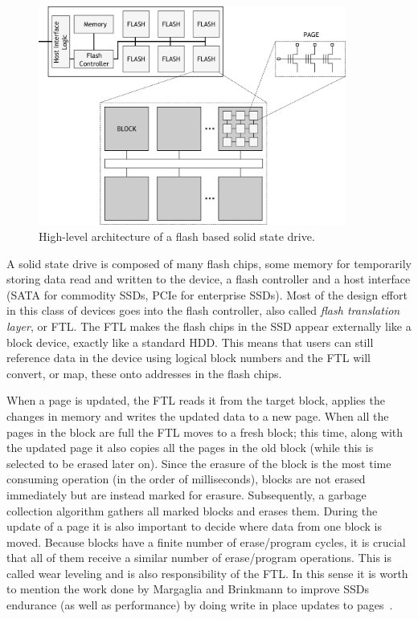 \begin{figure}[!htb]
\centering
\includegraphics[width=0.9\textwidth]{figures/flash-ssd}
\caption{High-level architecture of a flash based solid state drive.}
\label{figure: flash-ssd}
\end{figure}

A solid state drive is composed of many flash chips, some memory for temporarily storing data read and written to the device, a flash controller and a host interface (SATA for commodity SSDs, PCIe for enterprise SSDs). Most 
of the design effort in this class of devices goes into the flash controller, also called \textit{flash translation layer}, or FTL. The FTL makes the flash chips in the SSD appear externally like a block device, exactly like 
a standard HDD. This means that users can still reference data in the device using logical block numbers and the FTL will convert, or map, these onto addresses in the flash chips.

When a page is updated, the FTL reads it from the target block, applies the changes in memory and writes the updated data to a new page. When all the pages in the block are full the FTL moves to a fresh block; this time, along
with the updated page it also copies all the pages in the old block (while this is selected to be erased later on). Since the erasure of the block is the most time consuming operation (in the order of milliseconds), blocks
are not erased immediately but are instead marked for erasure. Subsequently, a garbage collection algorithm gathers all marked blocks and erases them. During the update of a page it is also important to decide where data from
one block is moved. Because blocks have a finite number of erase/program cycles, it is crucial that all of them receive a similar number of erase/program operations. This is called wear leveling and is also responsibility of
the FTL. In this sense it is worth to mention the work done by Margaglia and Brinkmann to improve SSDs endurance (as well as performance) by doing write in place updates to pages~\cite{Margaglia2015}.

